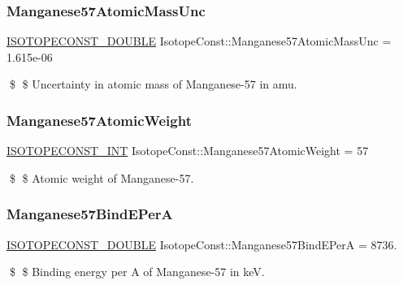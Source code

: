 \subsubsection{\texorpdfstring{Manganese57\+Atomic\+Mass\+Unc}{Manganese57AtomicMassUnc}}
{\footnotesize\ttfamily \mbox{\hyperlink{group___isotope_const-_macros_ga8f45a7272ce02c0b4c65c44636ed719a}{I\+S\+O\+T\+O\+P\+E\+C\+O\+N\+S\+T\+\_\+\+D\+O\+U\+B\+LE}} Isotope\+Const\+::\+Manganese57\+Atomic\+Mass\+Unc = 1.\+615e-\/06}

\$ \$ Uncertainty in atomic mass of Manganese-\/57 in amu. \mbox{\label{group___isotope_const-_manganese-_mn57_ga367a06016a56807c3fc5fbd6d423af7f}} 
\subsubsection{\texorpdfstring{Manganese57\+Atomic\+Weight}{Manganese57AtomicWeight}}
{\footnotesize\ttfamily \mbox{\hyperlink{group___isotope_const-_macros_ga5f18360b3e99483a35c32d789e62621c}{I\+S\+O\+T\+O\+P\+E\+C\+O\+N\+S\+T\+\_\+\+I\+NT}} Isotope\+Const\+::\+Manganese57\+Atomic\+Weight = 57}

\$ \$ Atomic weight of Manganese-\/57. \mbox{\label{group___isotope_const-_manganese-_mn57_gad12e2a1bc00a5067995208104ad597e0}} 
\subsubsection{\texorpdfstring{Manganese57\+Bind\+E\+PerA}{Manganese57BindEPerA}}
{\footnotesize\ttfamily \mbox{\hyperlink{group___isotope_const-_macros_ga8f45a7272ce02c0b4c65c44636ed719a}{I\+S\+O\+T\+O\+P\+E\+C\+O\+N\+S\+T\+\_\+\+D\+O\+U\+B\+LE}} Isotope\+Const\+::\+Manganese57\+Bind\+E\+PerA = 8736.}

\$ \$ Binding energy per A of Manganese-\/57 in keV. \mbox{\label{group___isotope_const-_manganese-_mn57_ga78c8e872ce794bb0f9f23b5fffd5e38a}} 

